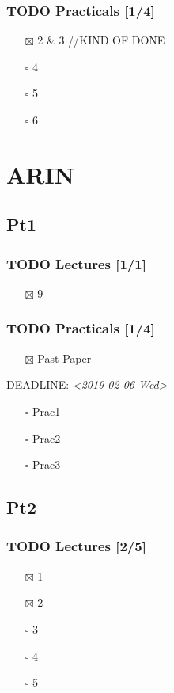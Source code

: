 \documentclass[11pt]{article}
\begin{document}
\subsubsection{{\bfseries\sffamily TODO} Practicals [1/4]}
\label{sec:org3100df9}
\begin{itemize}
\item[{$\boxtimes$}] 2 \& 3 //KIND OF DONE
\item[{$\square$}] 4
\item[{$\square$}] 5
\item[{$\square$}] 6
\end{itemize}
\section{ARIN}
\label{sec:org6c76e8f}
\subsection{Pt1}
\label{sec:orgb53d1c1}
\subsubsection{{\bfseries\sffamily TODO} Lectures [1/1]}
\label{sec:orge307203}
\begin{itemize}
\item[{$\boxtimes$}] 9
\end{itemize}
\subsubsection{{\bfseries\sffamily TODO} Practicals [1/4]}
\label{sec:orgd2aeb7d}
\begin{itemize}
\item[{$\boxtimes$}] Past Paper
\end{itemize}
DEADLINE: \textit{<2019-02-06 Wed>}
\begin{itemize}
\item[{$\square$}] Prac1
\item[{$\square$}] Prac2
\item[{$\square$}] Prac3
\end{itemize}
\subsection{Pt2}
\label{sec:org388a7b8}
\subsubsection{{\bfseries\sffamily TODO} Lectures [2/5]}
\label{sec:orgf70d424}
\begin{itemize}
\item[{$\boxtimes$}] 1
\item[{$\boxtimes$}] 2
\item[{$\square$}] 3
\item[{$\square$}] 4
\item[{$\square$}] 5
\end{itemize}
\end{document}
